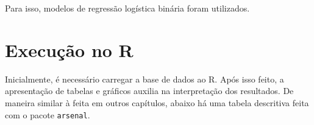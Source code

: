 \documentclass[
]{book}
\newenvironment{Shaded}{\begin{snugshade}}{\end{snugshade}}
\newcommand{\DataTypeTok}[1]{\textcolor[rgb]{0.13,0.29,0.53}{#1}}
\newcommand{\KeywordTok}[1]{\textcolor[rgb]{0.13,0.29,0.53}{\textbf{#1}}}
\newcommand{\NormalTok}[1]{#1}
\newcommand{\OperatorTok}[1]{\textcolor[rgb]{0.81,0.36,0.00}{\textbf{#1}}}
\newcommand{\OtherTok}[1]{\textcolor[rgb]{0.56,0.35,0.01}{#1}}
\newcommand{\StringTok}[1]{\textcolor[rgb]{0.31,0.60,0.02}{#1}}
\begin{document}
Para isso, modelos de regressão logística binária foram utilizados.

\hypertarget{execuuxe7uxe3o-no-r-15}{%
\section{Execução no R}\label{execuuxe7uxe3o-no-r-15}}

Inicialmente, é necessário carregar a base de dados ao R. Após isso feito, a apresentação de tabelas e gráficos auxilia na interpretação dos resultados. De maneira similar à feita em outros capítulos, abaixo há uma tabela descritiva feita com o pacote \texttt{arsenal}.

\begin{Shaded}
\end{Shaded}
\end{document}
